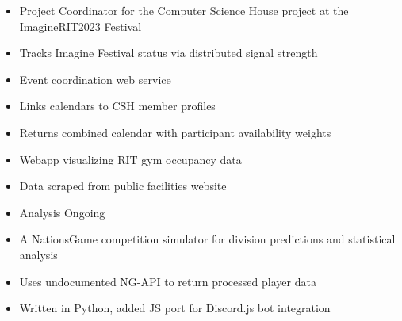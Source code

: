 \documentclass[10pt,a4paper,ragged2e,withhyper]{altacv}
\begin{document}
\begin{paracol}{2}


\begin{itemize}
    \item Project Coordinator for the Computer Science House project at the ImagineRIT2023 Festival
    \item Tracks Imagine Festival status via distributed signal strength
\end{itemize}\par


\divider

\begin{itemize}
    \item Event coordination web service
    \item Links calendars to CSH member profiles
    \item Returns combined calendar with participant availability weights
\end{itemize}

\divider

\begin{itemize}
    \item Webapp visualizing RIT gym occupancy data 
    \item Data scraped from public facilities website
    \item Analysis Ongoing
\end{itemize}

\divider


\begin{itemize}
    \item A NationsGame competition simulator for division predictions and statistical analysis
    \item Uses undocumented NG-API to return processed player data
    \item Written in Python, added JS port for Discord.js bot integration
\end{itemize}\par


\end{paracol}
\end{document}
